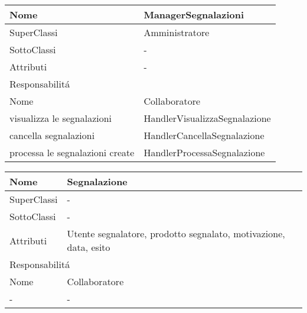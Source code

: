 


\begin{center}
    \begin{tabular}{ |p{3cm}|p{3cm}|p{3cm}|p{3cm}| }
        \hline
        Nome & \multicolumn{3}{|p{9cm}|}{ManagerSegnalazioni} \\\hline
        SuperClassi & \multicolumn{3}{|p{9cm}|}{Amministratore} \\\hline
        SottoClassi & \multicolumn{3}{|p{9cm}|}{-} \\\hline
        Attributi & \multicolumn{3}{|p{9cm}|}{-} \\\hline
        \multicolumn{4}{|p{12cm}|}{Responsabilit\'a} \\\hline
        \multicolumn{2}{|p{6cm}|}{Nome} & \multicolumn{2}{|p{6cm}|}{Collaboratore} \\\hline
        \multicolumn{2}{|p{6cm}|}{visualizza le segnalazioni} & \multicolumn{2}{|p{6cm}|}{HandlerVisualizzaSegnalazione} \\\hline
        \multicolumn{2}{|p{6cm}|}{cancella segnalazioni} & \multicolumn{2}{|p{6cm}|}{HandlerCancellaSegnalazione} \\\hline
        \multicolumn{2}{|p{6cm}|}{processa le segnalazioni create} & \multicolumn{2}{|p{6cm}|}{HandlerProcessaSegnalazione} \\\hline
    \end{tabular}
\end{center}

\begin{center}
    \begin{tabular}{ |p{3cm}|p{3cm}|p{3cm}|p{3cm}| }
        \hline
        Nome & \multicolumn{3}{|p{9cm}|}{Segnalazione} \\\hline
        SuperClassi & \multicolumn{3}{|p{9cm}|}{-} \\\hline
        SottoClassi & \multicolumn{3}{|p{9cm}|}{-} \\\hline
        Attributi & \multicolumn{3}{|p{9cm}|}{Utente segnalatore, prodotto segnalato, motivazione, data, esito} \\\hline
        \multicolumn{4}{|p{12cm}|}{Responsabilit\'a} \\\hline
        \multicolumn{2}{|p{6cm}|}{Nome} & \multicolumn{2}{|p{6cm}|}{Collaboratore} \\\hline
        \multicolumn{2}{|p{6cm}|}{-} & \multicolumn{2}{|p{6cm}|}{-} \\\hline
    \end{tabular}
\end{center}

